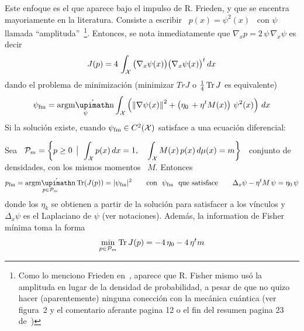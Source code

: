 Este enfoque es el que aparece bajo el impulso de R.  Frieden, y que se encentra
mayoriamente en la  literatura.  Consiste a escribir \ $p(x)  = \psi^2(x)$ \ con
$\psi$    llamada     ``amplituda''~\footnote{Como    lo     menciono    Frieden
en~\cite{FriSof95}, aparece que  R. Fisher mismo us\'o la amplituda  en lugar de
la  densidad de  probabilidad, a  pesar de  que no  quizo hacer  (aparentemente)
ninguna conecci\'on con  la mec\'anica cu\'antica (ver figura~2  y el comentario
aferante  pagina  12  o  el  fin del  resumen  pagina  23  de~\cite{FisMat43})}.
Entonces,  se nota  inmediatamente que  $\nabla_x  p  = 2  \,
\psi  \,   \nabla_x  \psi $ es decir
%
\[
J(p)  = 4 \, \int_{\mathcal{X}} \big( \nabla_x \psi(x) \big) \big( \nabla_x \psi(x) \big)^t
\, dx
\]
%
dando  el problema  de minimizaci\'on  (minimizar $Tr  J$ o  $\frac14 \operatorname{Tr}  J$ es
equivalente)
%
\[
\psi_{\mathrm{fm}} = \argmin_\psi \int_\X \left( \left\| \nabla \psi(x) \right\|^2
+ \left( \eta_0 \, + \eta^t M(x) \right) \, \psi^2(x) \right) \, dx
\]
%
Si la soluci\'on existe, cuando $\psi_{\mathrm{fm}} \in C^2(\mathcal{X})$ satisface a una
ecuaci\'on diferencial:
%
\begin{lema}
\label{Lem:SZ:MinFisherSchrodinger}
%
Sea  \  $\displaystyle  \mathcal{P}_m =  \left\{  p  \ge  0  \:\: \big| \:\:   \int_{\mathcal{X}} p(x)  \,  dx  =
  1,  \quad  \int_{\mathcal{X}} M(x)  \,  p(x)  \, d\mu(x)  =  m  \right\}$ \  conjunto  de
  densidades, con los mismos momentos \ $M$. Entonces
  \[
  p_{\mathrm{fm}}      =     \argmin_{p      \in      \P_m}     \Tr(J(p))      =
  |\psi_{\mathrm{fm}}|^2   \qquad  \mbox{con   \   $\psi_{\mathrm{fm}}$  \   que
  satisface} \qquad \Delta_x \psi - \eta^t M \, \psi = \eta_0 \, \psi
  \]
  donde los $\eta_k$ se obtienen a partir de la soluci\'on para satisfacer a los
  v\'inculos   y   $\Delta_x    \psi$   es   el   Laplaciano    de   $\psi$   (ver
  notaciones). Adem\'as, la information de Fisher m\'inima toma la forma
%
\[
\min_{p \in \mathcal{P}_m} \operatorname{Tr} J(p) = - 4 \, \eta_0 - 4 \, \eta^t m
\]
\end{lema}
%
